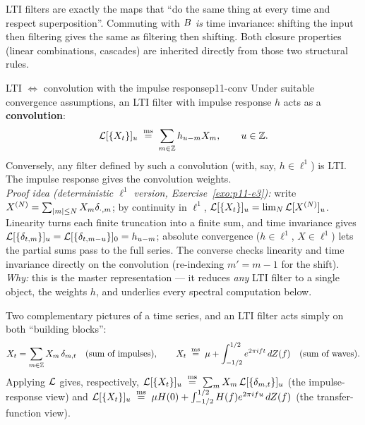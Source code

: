 \begin{intuition}
LTI filters are exactly the maps that ``do the same thing at every time and
respect superposition''. Commuting with $B$ \emph{is} time invariance:
shifting the input then filtering gives the same as filtering then shifting. Both
closure properties (linear combinations, cascades) are inherited directly from
those two structural rules.
\end{intuition}

\begin{theorem}{LTI $\Leftrightarrow$ convolution with the impulse response}{p11-conv}
Under suitable convergence assumptions, an LTI filter with impulse response $h$
acts as a \textbf{convolution}:
\[
\mathcal{L}[\{X_t\}]_u\;\overset{\mathrm{ms}}{=}\;\sum_{m\in\mathbb{Z}}h_{u-m}X_m,\qquad u\in\mathbb{Z} .
\]
Conversely, any filter defined by such a convolution (with, say, $h\in\ell^1$)
is LTI. The impulse response gives the convolution weights.\\[2pt]
\textit{Proof idea (deterministic $\ell^1$ version, Exercise~\ref{exo:p11-e3}):}
write $X^{(N)}=\sum_{\left\lvert m \right\rvert\le N}X_m\delta_{\cdot,m}$; by continuity in
$\ell^1$, $\mathcal{L}[\{X_t\}]_u=\lim_N\mathcal{L}[X^{(N)}]_u$. Linearity turns each finite
truncation into a finite sum, and time invariance gives
$\mathcal{L}[\{\delta_{t,m}\}]_u=\mathcal{L}[\{\delta_{t,m-u}\}]_0=h_{u-m}$; absolute
convergence ($h\in\ell^1$, $X\in\ell^1$) lets the partial sums pass to the full
series. The converse checks linearity and time invariance directly on the
convolution (re-indexing $m'=m-1$ for the shift).\\
\textit{Why:} this is the master representation --- it reduces \emph{any} LTI
filter to a single object, the weights $h$, and underlies every spectral
computation below.
\end{theorem}

\begin{intuition}
Two complementary pictures of a time series, and an LTI filter acts simply on
both ``building blocks'':
\[
X_t=\sum_{m\in\mathbb{Z}}X_m\,\delta_{m,t}\quad(\text{sum of impulses}),
\qquad
X_t\;\overset{\mathrm{ms}}{=}\;\mu+\int_{-1/2}^{1/2}e^{2\pi i f t}\,dZ(f)\quad(\text{sum of waves}).
\]
Applying $\mathcal{L}$ gives, respectively,
$\mathcal{L}[\{X_t\}]_u\;\overset{\mathrm{ms}}{=}\;\sum_m X_m\,\mathcal{L}[\{\delta_{m,t}\}]_u$ (the impulse-response
view) and
$\mathcal{L}[\{X_t\}]_u\;\overset{\mathrm{ms}}{=}\;\mu H(0)+\int_{-1/2}^{1/2}H(f)e^{2\pi i f u}\,dZ(f)$ (the
transfer-function view).
\end{intuition}

